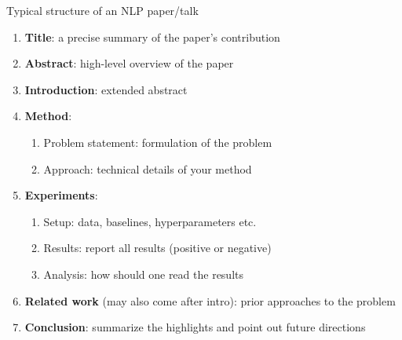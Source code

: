 \documentclass[usenames,dvipsnames,11pt,aspectratio=169]{beamer}
\begin{document}
\begin{frame}
    {Typical structure of an NLP paper/talk}
    \begin{enumerate}
        \item \textbf{Title}: a precise summary of the paper's contribution
        \item \textbf{Abstract}: high-level overview of the paper
        \item \textbf{Introduction}: extended abstract
        \item \textbf{Method}: 
            \begin{enumerate}
                \item Problem statement: formulation of the problem
                \item Approach: technical details of your method
            \end{enumerate}
        \item \textbf{Experiments}:
            \begin{enumerate}
                \item Setup: data, baselines, hyperparameters etc.
                \item Results: report all results (positive or negative)
                \item Analysis: how should one read the results 
            \end{enumerate}
        \item \textbf{Related work} (may also come after intro): prior approaches to the problem
        \item \textbf{Conclusion}: summarize the highlights and point out future directions
    \end{enumerate}
\end{frame}
\end{document}
